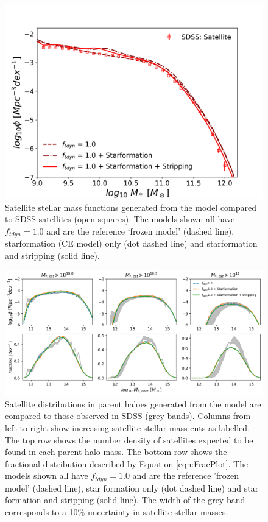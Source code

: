 \begin{figure}
    \centering
    \includegraphics[width = \linewidth]{Figures/Chapter3/Fig11.png}
    \caption{Satellite stellar mass functions generated from the model compared to SDSS satellites (open squares). The models shown all have $f_{tdyn} = 1.0$ and are the reference `frozen model' (dashed line), starformation (CE model) only (dot dashed line) and starformation and stripping (solid line).}
    \label{fig:SMF_SF_Strip}
\end{figure}

\begin{figure}
    \centering
    \includegraphics[width = \linewidth]{Figures/Chapter3/Sat_Dist_SF_Strip.png}
    \caption{Satellite distributions in parent haloes generated from the model are compared to those observed in SDSS (grey bands). Columns from left to right show increasing satellite stellar mass cuts as labelled. The top row shows the number density of satellites expected to be found in each parent halo mass. The bottom row shows the fractional distribution described by Equation \ref{eqn:FracPlot}. The models shown all have $f_{tdyn} = 1.0$ and are the reference 'frozen model' (dashed line), star formation only (dot dashed line) and star formation and stripping (solid line). The width of the grey band corresponds to a 10\% uncertainty in satellite stellar masses.}
    \label{fig:Sat_Dist_SF_Strip}
\end{figure}

